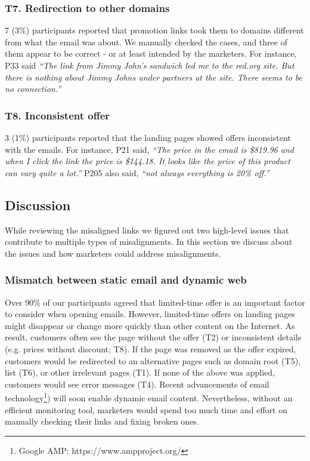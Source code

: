 \documentclass{sigchi}
\begin{document}
\subsubsection{T7. Redirection to other domains}
7 (3\%) participants reported that promotion links took them to domains different from what the email was about. We manually checked the cases, and three of them appear to be correct - or at least intended by the marketers. For instance, P33 said \textit{``The link from Jimmy John's sandwich led me to the red.org site. But there is nothing about Jimmy Johns under partners at the site. There seems to be no connection.''}     
\subsubsection{T8. Inconsistent offer}
3 (1\%) participants reported that the landing pages showed offers inconsistent with the emails. For instance, P21 said, \textit{``The price in the email is \$819.96 and when I click the link the price is \$144.18. It looks like the price of this product can vary quite a lot.''} P205 also said, \textit{``not always everything is 20\% off.''}

\subsection{Discussion}
While reviewing the misaligned links we figured out two high-level issues that contribute to multiple types of misalignments. In this section we discuss about the issues and how marketers could address misalignments. 

\subsubsection{Mismatch between static email and dynamic web}
Over 90\% of our participants agreed that limited-time offer is an important factor to consider when opening emails. However, limited-time offers on landing pages might disappear or change more quickly than other content on the Internet. As result, customers often see the page without the offer (T2) or  inconsistent details (e.g. prices without discount; T8). If the page was removed as the offer expired, customers would be redirected to an alternative pages such as domain root (T5), list (T6), or other irrelevant pages (T1). If none of the above was applied, customers would see error messages (T4). Recent advancements of email technology\footnote{Google AMP; https://www.ampproject.org/}) will soon enable dynamic email content. Nevertheless, without an efficient monitoring tool, marketers would spend too much time and effort on manually checking their links and fixing broken ones.  
\end{document}
